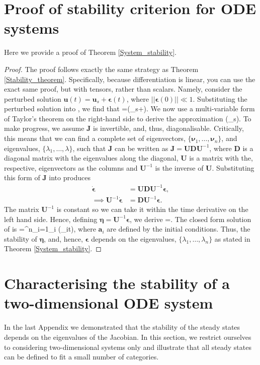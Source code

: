 \chapter{Proof of stability criterion for ODE systems}\label{Proof of stability criterion for ODE systems}
Here we provide a proof of Theorem \ref{System_stability}.
\begin{proof}
The proof follows exactly the same strategy as Theorem \ref{Stability_theorem}. Specifically, because differentiation is linear, you can use the exact same proof, but with tensors, rather than scalars. Namely,
consider the perturbed solution $\bm{u}(t)=\bm{u}_s+\bm{\epsilon}(t)$, where $||\bm{\epsilon}(0)|| \ll 1$. Substituting the perturbed solution into , we find that
\bb
\dot{\bm{\epsilon}}=(_s+\bm{\epsilon}).
\ee
We now use a multi-variable form of Taylor's theorem on the right-hand side to derive the approximation
\bb
\dot{\bm{\epsilon}}\approx {}(_s)\bm{\epsilon}.\label{Approx_J}
\ee
To make progress, we assume $\bm{J}$ is invertible, and, thus, diagonalisable. Critically, this means that we can find a complete set of eigenvectors, $\{\bm{\nu}_1,\dots,\bm{\nu}_n\}$, and eigenvalues, $\{\lambda_1,\dots,\lambda\}$, such that $\bm{J}$ can be written as $\bm{J}=\bm{U}\bm{D}\bm{U}^{-1}$, where  $\bm{D}$ is a diagonal matrix with the eigenvalues along the diagonal, $\bm{U}$ is a matrix with the, respective, eigenvectors as the columns and $\bm{U}^{-1}$ is the inverse of $\bm{U}$. Substituting this form of $\bm{J}$ into  produces
\begin{align}
\dot{\bm{\epsilon}}&= \bm{U}\bm{D}\bm{U}^{-1}\bm{\epsilon},\\
\implies\bm{U}^{-1}\dot{\bm{\epsilon}}&=\bm{D}\bm{U}^{-1}\bm{\epsilon}.
\end{align}
The matrix $\bm{U}^{-1}$ is constant so we can take it within the time derivative on the left hand side. Hence, defining $\bm{\eta}=\bm{U}^{-1}\bm{\epsilon}$, we derive
\bb
\dot{\bm{\eta}}=\bm{\eta}.\label{Vec_diag}
\ee
The closed form solution of  is
\bb
\bm{\eta}=\sum^n_{i=1}_i \exp(\lambda_it),
\ee
where $\bm{a}_i$ are defined by the initial conditions. Thus, the stability of $\bm{\eta}$, and, hence, $\bm{\epsilon}$ depends on the eigenvalues, $\{\lambda_1,\dots,\lambda_n\}$ as stated in Theorem \ref{System_stability}.
\end{proof}

\chapter{Characterising the stability of a two-dimensional ODE system}\label{Characterising the stability of a two-dimensional ODE system}
In the last Appendix we demonstrated that the stability of the steady states depends on the eigenvalues of the Jacobian. In this section, we restrict ourselves to considering two-dimensional systems only and illustrate that all steady states can be defined to fit a small number of categories.


